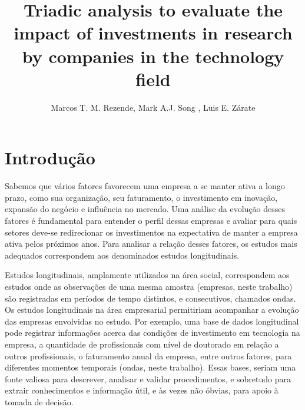\documentclass[kdmile,a4paper]{kdmile} %
\title{Triadic analysis to evaluate the impact of investments in research by companies in the technology field\\}
\author{Marcos T. M. Rezende\inst{1}, Mark A.J. Song \inst{1}, Luis E. Zárate\inst{1}}
\institute{Pontifícia Universidade Católica de Minas Gerais, Departamento de Ciência da Computação, Brazil \\ \email{mtmrezende@sga.pucminas.br, song@pucminas.br, zarate@pucminas.br}
}
\begin{document}
\begin{bottomstuff}
\end{bottomstuff}

\maketitle

\section{Introdução}

Sabemos que vários fatores favorecem uma empresa a se manter ativa a longo prazo, como sua organização, seu faturamento, o investimento em inovação, expansão do negócio e influência no mercado. Uma análise da evolução desses fatores é fundamental para entender o perfil dessas empresas e avaliar para quais setores deve-se redirecionar os investimentos na expectativa de manter a empresa ativa pelos próximos anos. Para analisar a relação desses fatores, os estudos mais adequados correspondem aos denominados estudos longitudinais.

Estudos longitudinais, amplamente utilizados na área social, correspondem aos estudos onde as observações de uma mesma amostra (empresas, neste trabalho) são registradas em períodos de tempo distintos, e consecutivos, chamados ondas. Os estudos longitudinais na área empresarial permitiriam acompanhar a evolução das empresas envolvidas no estudo. Por exemplo, uma base de dados longitudinal pode registrar informações acerca das condições de investimento em tecnologia na empresa, a quantidade de profissionais com nível de doutorado em relação a outros profissionais, o faturamento anual da empresa, entre outros fatores, para diferentes momentos temporais (ondas, neste trabalho). Essas bases, seriam uma fonte valiosa para descrever, analisar e validar procedimentos, e sobretudo para extrair conhecimentos e informação útil, e às vezes não óbvias, para apoio à tomada de decisão.
\end{document}
